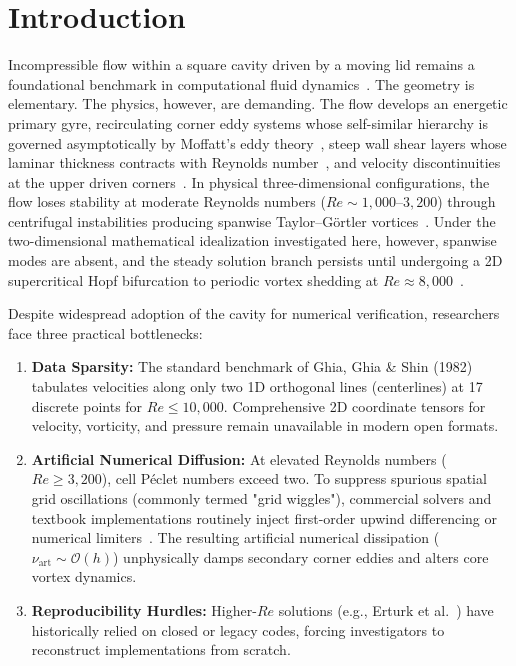 \documentclass[11pt,a4paper]{article}
\begin{document}
\section{Introduction}
Incompressible flow within a square cavity driven by a moving lid remains a foundational benchmark in computational fluid dynamics~\cite{ghia1982high,erturk2005numerical,bruneau20062d,hou1995lattice}. The geometry is elementary. The physics, however, are demanding. The flow develops an energetic primary gyre, recirculating corner eddy systems whose self-similar hierarchy is governed asymptotically by Moffatt's eddy theory~\cite{moffatt1964viscous}, steep wall shear layers whose laminar thickness contracts with Reynolds number~\cite{prandtl1904uber,schlichting2000boundary}, and velocity discontinuities at the upper driven corners~\cite{botella1998benchmark,bruneau20062d}. In physical three-dimensional configurations, the flow loses stability at moderate Reynolds numbers ($Re \sim 1{,}000\text{--}3{,}200$) through centrifugal instabilities producing spanwise Taylor--G\"ortler vortices~\cite{koseff1984hydrothermal,aidun1991primary,albensoeder2001three}. Under the two-dimensional mathematical idealization investigated here, however, spanwise modes are absent, and the steady solution branch persists until undergoing a 2D supercritical Hopf bifurcation to periodic vortex shedding at $Re \approx 8{,}000$~\cite{shen1991hopf,peng2003transition,bruneau20062d}.

Despite widespread adoption of the cavity for numerical verification, researchers face three practical bottlenecks:
\begin{enumerate}
    \item \textbf{Data Sparsity:} The standard benchmark of Ghia, Ghia \& Shin (1982)~\cite{ghia1982high} tabulates velocities along only two 1D orthogonal lines (centerlines) at 17 discrete points for $Re \le 10{,}000$. Comprehensive 2D coordinate tensors for velocity, vorticity, and pressure remain unavailable in modern open formats.
    \item \textbf{Artificial Numerical Diffusion:} At elevated Reynolds numbers ($Re \ge 3{,}200$), cell P\'eclet numbers exceed two. To suppress spurious spatial grid oscillations (commonly termed "grid wiggles"), commercial solvers and textbook implementations routinely inject first-order upwind differencing or numerical limiters~\cite{patankar1980numerical,spalding1972novel,roache1998verification,ferziger2002computational}. The resulting artificial numerical dissipation ($\nu_{\text{art}} \sim \mathcal{O}(h)$) unphysically damps secondary corner eddies and alters core vortex dynamics.
    \item \textbf{Reproducibility Hurdles:} Higher-$Re$ solutions (e.g., Erturk et al.~\cite{erturk2005numerical,erturk2009discussions}) have historically relied on closed or legacy codes, forcing investigators to reconstruct implementations from scratch.
\end{enumerate}
\end{document}
